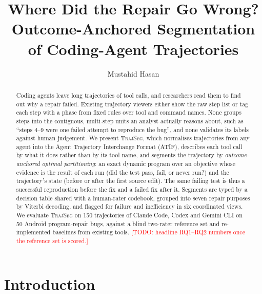 \documentclass[sigconf,nonacm,10pt]{acmart}
\newcommand{\TODO}[1]{\textcolor{red}{[TODO: #1]}}
\newcommand{\tool}{\textsc{TrajSeg}}   %
\begin{document}
\title{Where Did the Repair Go Wrong? Outcome-Anchored Segmentation of
       Coding-Agent Trajectories}

\author{Mustahid Hasan}

\renewcommand{\shortauthors}{Hasan}

\begin{abstract}
Coding agents leave long trajectories of tool calls, and researchers read them to
find out why a repair failed. Existing trajectory viewers either show the raw step
list or tag each step with a phase from fixed rules over tool and command names.
None groups steps into the contiguous, multi-step units an analyst actually reasons
about, such as ``steps 4--9 were one failed attempt to reproduce the bug'', and none
validates its labels against human judgement. We present \tool{}, which normalises
trajectories from any agent into the Agent Trajectory Interchange Format (ATIF),
describes each tool call by what it does rather than by its tool name, and segments
the trajectory by \emph{outcome-anchored optimal partitioning}: an exact dynamic
program over an objective whose evidence is the result of each run (did the test
pass, fail, or never run?) and the trajectory's state (before or after the first
source edit). The same failing test is thus a successful reproduction before the fix
and a failed fix after it. Segments are typed by a decision table shared with a
human-rater codebook, grouped into seven repair purposes by Viterbi decoding, and
flagged for failure and inefficiency in six coordinated views. We evaluate \tool{} on
150 trajectories of Claude Code, Codex and Gemini CLI on 50 Android program-repair
bugs, against a blind two-rater reference set and re-implemented baselines from
existing tools. \TODO{headline RQ1--RQ2 numbers once the reference set is scored.}
\end{abstract}


\maketitle

\section{Introduction}
\label{sec:intro}
\end{document}

